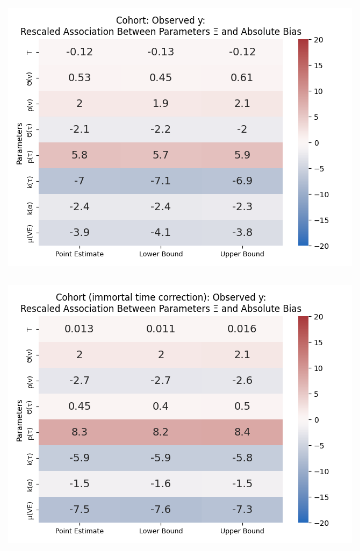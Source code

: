 \documentclass[12pt]{article}
\begin{document}
\begin{figure}[H]
	\begin{subfigure}[t]{0.23\linewidth}
		\centering
		\caption{}
		\includegraphics[scale=0.25]{VEMethod_Drivers1b_FEest_Realistic_Li_MSpec_Heatmap5.png}
	\end{subfigure}
	\begin{subfigure}[t]{0.23\linewidth}
		\centering
		\caption{}
		\includegraphics[scale=0.25]{VEMethod_Drivers1b_FEest_Realistic_Li_MSpec_Heatmap6.png}
	\end{subfigure}
	\begin{subfigure}[t]{0.23\linewidth}
		\centering
		\caption{}

\end{subfigure}
\end{figure}
\end{document}
